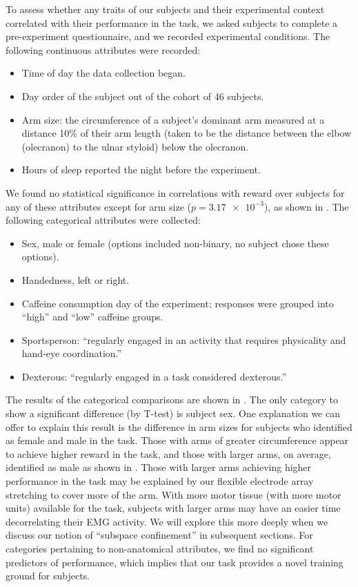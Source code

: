 \documentclass[../main.tex]{subfiles}
\begin{document}
To assess whether any traits of our subjects and their experimental context correlated with their performance in the task, we asked subjects to complete a pre-experiment questionnaire, and we recorded experimental conditions. The following continuous attributes were recorded:
%
\begin{itemize}
    \item Time of day the data collection began. %
    \item Day order of the subject out of the cohort of 46 subjects. %
    \item Arm size: the circumference of a subject's dominant arm measured at a distance 10\% of their arm length (taken to be the distance between the elbow (olecranon) to the ulnar styloid) below the olecranon. %
    \item Hours of sleep reported the night before the experiment. %
\end{itemize}
%
We found no statistical significance in correlations with reward over subjects for any of these attributes except for arm size ($p=\num{3.17e-3}$), as shown in . The following categorical attributes were collected:
%
\begin{itemize}
    \item Sex, male or female (options included non-binary, no subject chose these options). %
    \item Handedness, left or right. %
    \item Caffeine consumption day of the experiment; responses were grouped into ``high'' and ``low'' caffeine groups. %
    \item Sportsperson: ``regularly engaged in an activity that requires physicality and hand-eye coordination.'' %
    \item Dexterous: ``regularly engaged in a task considered dexterous.'' %
\end{itemize}
%
The results of the categorical comparisons are shown in . The only category to show a significant difference (by T-test) is subject sex. One explanation we can offer to explain this result is the difference in arm sizes for subjects who identified as female and male in the task. Those with arms of greater circumference appear to achieve higher reward in the task, and those with larger arms, on average, identified as male as shown in . Those with larger arms achieving higher performance in the task may be explained by our flexible electrode array stretching to cover more of the arm. With more motor tissue (with more motor units) available for the task, subjects with larger arms may have an easier time decorrelating their EMG activity. We will explore this more deeply when we discuss our notion of ``subspace confinement'' in subsequent sections. For categories pertaining to non-anatomical attributes, we find no significant predictors of performance, which implies that our task provides a novel training ground for subjects.
\end{document}
